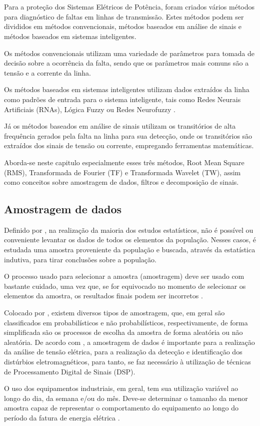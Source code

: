 \chapter{\captres}\label{analise}
\par
Para a proteção dos Sistemas Elétricos de Potência, foram criados vários métodos para diagnóstico de faltas em linhas de transmissão. Estes métodos podem ser divididos em métodos convencionais, métodos baseados em análise de sinais e métodos baseados em sistemas inteligentes.
\par
Os métodos convencionais utilizam uma variedade de parâmetros para tomada de decisão sobre a ocorrência da falta, sendo que os parâmetros mais comuns são a tensão e a corrente da linha. 
\par
Os métodos baseados em sistemas inteligentes utilizam dados extraídos da linha como padrões de entrada para o sistema inteligente, tais como Redes Neurais Artificiais (RNAs), Lógica Fuzzy ou Redes Neurofuzzy \cite{INA10}. 
\par 
Já os métodos baseados em análise de sinais utilizam os transitórios de alta frequência gerados pela falta na linha para sua detecção, onde os transitórios são extraídos dos sinais de tensão ou corrente, empregando ferramentas matemáticas. 
\par
Aborda-se neste capitulo especialmente esses três métodos, Root Mean Square (RMS), Transformada de Fourier (TF) e Transformada Wavelet (TW), assim como conceitos sobre amostragem de dados, filtros e decomposição de sinais.

\section{Amostragem de dados}
\par
Definido por \cite{SIL09}, na realização da maioria dos estudos estatísticos, não é possível ou conveniente levantar os dados de todos os elementos da população. Nesses casos, é estudada uma amostra proveniente da população e buscada, através da estatística indutiva, para tirar conclusões sobre a população.
\par
O processo usado para selecionar a amostra (amostragem) deve ser usado com bastante cuidado, uma vez que, se for equivocado no momento de selecionar os elementos da amostra, os resultados finais podem ser incorretos \cite{SIL09}. 
\par Colocado por \cite{SIL09}, existem diversos tipos de amostragem, que, em geral são classificados em probabilísticos e não probabilísticos, respectivamente, de forma simplificada são os processos de escolha da amostra de forma aleatória ou não aleatória.
De acordo com \cite{BAC11}, a amostragem de dados é importante para a realização da análise de tensão elétrica, para a realização da detecção e identificação dos distúrbios eletromagnéticos, para tanto, se faz necessário à utilização de técnicas de Processamento Digital de Sinais (DSP).
\par
O uso dos equipamentos industriais, em geral, tem sua utilização variável ao longo do dia, da semana e/ou do mês. Deve-se determinar o tamanho da menor amostra capaz de representar o comportamento do equipamento ao longo do período da fatura de energia elétrica \cite{BAC11}.
